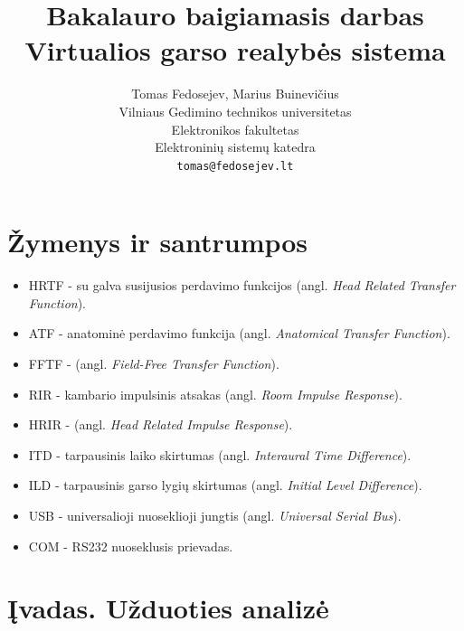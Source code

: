 \documentclass[]{vgtuef}
\author{Tomas Fedosejev, Marius Buinevičius\\Vilniaus Gedimino technikos
  universitetas\\Elektronikos fakultetas\\Elektroninių sistemų
  katedra\\\texttt{tomas@fedosejev.lt}}
\title{Bakalauro baigiamasis darbas\\Virtualios garso realybės sistema}
\begin{document}
\setcounter{page}{7}

\onehalfspacing

\tableofcontents


\section*{Žymenys ir santrumpos}

\begin{itemize}
\item HRTF - su galva susijusios perdavimo funkcijos (angl. \textit{Head Related Transfer Function}).
\item ATF - anatominė perdavimo funkcija (angl. \textit{Anatomical Transfer Function}).
\item FFTF - (angl. \textit{Field-Free Transfer Function}).
\item RIR - kambario impulsinis atsakas (angl. \textit{Room Impulse Response}).
\item HRIR - (angl. \textit{Head Related Impulse Response}).
\item ITD - tarpausinis laiko skirtumas (angl. \textit{Interaural Time Difference}).
\item ILD - tarpausinis garso lygių skirtumas (angl. \textit{Initial Level Difference}).
\item USB - universalioji nuoseklioji jungtis (angl. \textit{Universal Serial Bus}).
\item COM - RS232 nuoseklusis prievadas.

\end{itemize}


\section{Įvadas. Užduoties analizė}
\end{document}
